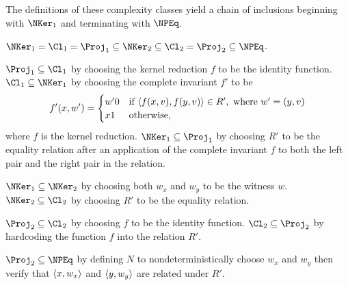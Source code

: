 The definitions of these complexity classes yield a chain of inclusions beginning with $\NKer_1$ and terminating with $\NPEq$.
\begin{theorem}\label{thm:definitions}
  $\NKer_1 = \Cl_1 = \Proj_1 \subseteq \NKer_2 \subseteq \Cl_2 = \Proj_2 \subseteq \NPEq$.
\end{theorem}
\begin{sketch}
  $\Proj_1 \subseteq \Cl_1$ by choosing the kernel reduction $f$ to be the identity function.
  $\Cl_1 \subseteq \NKer_1$ by choosing the complete invariant $f'$ to be
  \begin{equation*}
    f'(x, w') =
    \begin{cases}
      w'0 & \text{if } \langle f(x, v),f(y, v)\rangle \in R', \text{ where } w' = (y, v) \\
      x1 & \text{otherwise},
    \end{cases}
  \end{equation*}
  where $f$ is the kernel reduction.
  $\NKer_1 \subseteq \Proj_1$ by choosing $R'$ to be the equality relation after an application of the complete invariant $f$ to both the left pair and the right pair in the relation.

  $\NKer_1 \subseteq \NKer_2$ by choosing both $w_x$ and $w_y$ to be the witness $w$.
  $\NKer_2 \subseteq \Cl_2$ by choosing $R'$ to be the equality relation.

  $\Proj_2 \subseteq \Cl_2$ by choosing $f$ to be the identity function.
  $\Cl_2 \subseteq \Proj_2$ by hardcoding the function $f$ into the relation $R'$.

  $\Proj_2 \subseteq \NPEq$ by defining $N$ to nondeterministically choose $w_x$ and $w_y$ then verify that $\langle x,w_x\rangle$ and $\langle y,w_y\rangle$ are related under $R'$.
\end{sketch}

